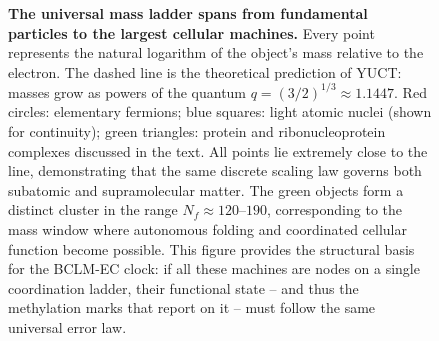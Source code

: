 \documentclass[12pt,a4paper]{article}
\begin{document}
\begin{figure}[H]
		\caption{\textbf{The universal mass ladder spans from fundamental particles to the largest cellular machines.} 
			Every point represents the natural logarithm of the object's mass relative to the electron. 
			The dashed line is the theoretical prediction of YUCT: masses grow as powers of the quantum \(q = (3/2)^{1/3} \approx 1.1447\). 
			Red circles: elementary fermions; blue squares: light atomic nuclei (shown for continuity); green triangles: protein and ribonucleoprotein complexes discussed in the text. 
			All points lie extremely close to the line, demonstrating that the same discrete scaling law governs both subatomic and supramolecular matter. 
			The green objects form a distinct cluster in the range \(N_f \approx 120\)--\(190\), corresponding to the mass window where autonomous folding and coordinated cellular function become possible. 
			This figure provides the structural basis for the BCLM-EC clock: if all these machines are nodes on a single coordination ladder, their functional state -- and thus the methylation marks that report on it -- must follow the same universal error law.}
		\label{fig:mass_ladder_bclm}
	\end{figure}
	
\end{document}
